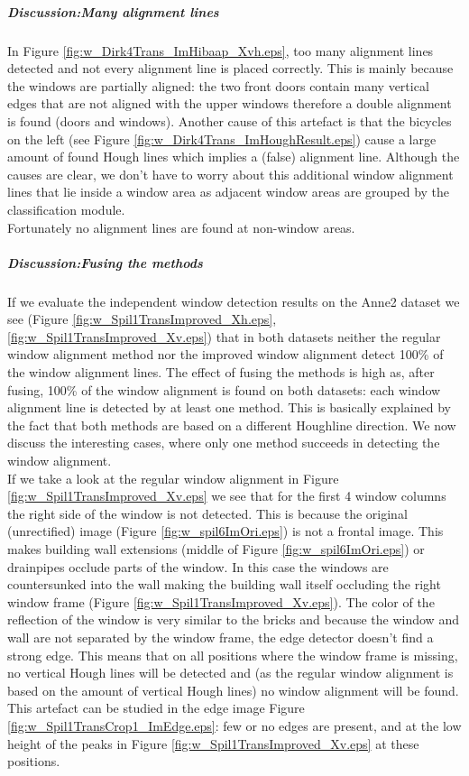 \subparagraph{Discussion:Many alignment lines}
In Figure \ref{fig:w_Dirk4Trans_ImHibaap_Xvh.eps}, too many alignment lines
detected and not every alignment line is placed correctly.  This is mainly
because the windows are partially aligned: the two front doors contain many
vertical edges that are not aligned with the upper windows therefore a double alignment
is found (doors and windows).  Another cause of this artefact is that the
bicycles on the left (see Figure \ref{fig:w_Dirk4Trans_ImHoughResult.eps}) cause
a large amount of found Hough lines which implies a (false) alignment line.
Although the causes are clear, we don't have to worry about this additional
window alignment lines that lie inside a window area as adjacent window areas
are grouped by the classification module.\\
Fortunately no alignment lines are found at non-window areas.


\subparagraph{Discussion:Fusing the methods}
If we evaluate the independent window detection results on the Anne2 dataset we see (Figure
\ref{fig:w_Spil1TransImproved_Xh.eps}, \ref{fig:w_Spil1TransImproved_Xv.eps})
that in both datasets neither the regular window alignment method nor the
improved window alignment detect 100\% of the window alignment lines.  The
effect of fusing the methods is high as, after fusing, 100\% of the window
alignment is found on both datasets: each window alignment line is detected by
at least one method.  This is basically explained by the fact that both methods
are based on a different Houghline direction.  We now discuss the interesting
cases, where only one method succeeds in detecting the window alignment.\\

\label{lab:occlusion} If we take a look at the regular window alignment in
Figure \ref{fig:w_Spil1TransImproved_Xv.eps} we see that for the first 4 window
columns the right side of the window is not detected.  This is because the
original (unrectified) image (Figure \ref{fig:w_spil6ImOri.eps}) is not a
frontal image.  This makes building wall extensions (middle of Figure
\ref{fig:w_spil6ImOri.eps}) or drainpipes occlude parts of the window.  In this
case the windows are countersunked into the wall making the building wall itself
occluding the right window frame (Figure \ref{fig:w_Spil1TransImproved_Xv.eps}).
The color of the reflection of the window is very similar to the bricks and
because the window and wall are not separated by the window frame, the edge
detector doesn't find a strong edge.  This means that on all positions where the
window frame is missing, no vertical Hough lines will be detected and (as the
regular window alignment is based on the amount of vertical Hough lines) no window
alignment will be found.  This artefact can be studied in the edge image Figure
\ref{fig:w_Spil1TransCrop1_ImEdge.eps}: few or no edges are present, and at the
low height of the peaks in Figure \ref{fig:w_Spil1TransImproved_Xv.eps} at these
positions.\\

